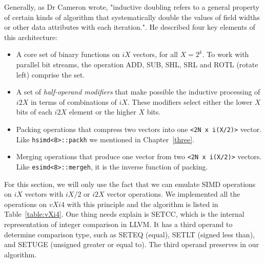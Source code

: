 Generally, as Dr Cameron wrote, "inductive doubling refers to a general property of certain kinds of algorithm that systematically double the values of field widths or other data attributes with each iteration."\cite{inductive_doubling_principle}. He described four key elements of this architecture:
\begin{itemize}
    \item A core set of binary functions on $iX$ vectors, for all $X = 2^k$. To work with parallel bit streams, the operation ADD, SUB, SHL, SRL and ROTL (rotate left) comprise the set.
    \item A set of \textit{half-operand modifiers} that make possible the inductive processing of $i2X$ in terms of combinations of $iX$. These modifiers select either the lower $X$ bits of each $i2X$ element or the higher $X$ bits.
    \item Packing operations that compress two {\tt <N x iX>} vectors into one {\tt <2N x i(X/2)>} vector. Like {\tt hsimd<8>::packh} we mentioned in Chapter~\ref{three}.
    \item Merging operations that produce one {\tt <N x iX>} vector from two {\tt <2N x i(X/2)>} vectors. Like {\tt esimd<8>::mergeh}, it is the inverse function of packing.
\end{itemize}

For this section, we will only use the fact that we can emulate SIMD operations on $iX$ vectors with $iX/2$ or $i2X$ vector operations. We implemented all the operations on $vXi4$ with this principle and the algorithm is listed in Table~\ref{table:vXi4}. One thing needs explain is SETCC, which is the internal representation of integer comparison in LLVM\@. It has a third operand to determine comparison type, such as SETEQ (equal), SETLT (signed less than), and SETUGE (unsigned greater or equal to). The third operand preserves in our algorithm.

